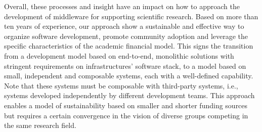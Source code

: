 \documentclass[preprint,12pt, a4paper]{elsarticle}
\begin{document}



Overall, these processes and insight have an impact on how to approach the
development of middleware for supporting scientific research. Based on more
than ten years of experience, our approach show a sustainable and effective
way to organize software development, promote community adoption and leverage
the specific characteristics of the academic financial model. This signs the
transition from a development model based on end-to-end, monolithic solutions
with stringent requirements on infrastructures' software stack, to a model
based on small, independent and composable systems, each with a well-defined
capability. Note that these systems must be composable with third-party
systems, i.e., systems developed independently by different development
teams. This approach enables a model of sustainability based on smaller and
shorter funding sources but requires a certain convergence in the vision of
diverse groups competing in the same research field.
\end{document}

